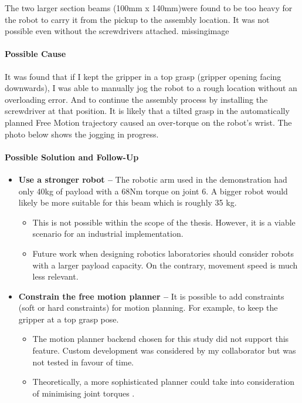 The two larger section beams (100mm x 140mm)were found to be too heavy for the robot to carry it from the pickup to the assembly location. It was not possible even without the screwdrivers attached.
missingimage

\paragraph{Possible Cause}
It was found that if I kept the gripper in a top grasp (gripper opening facing downwards), I was able to manually jog the robot to a rough location without an overloading error. And to continue the assembly process by installing the screwdriver at that position. It is likely that a tilted grasp in the automatically planned Free Motion trajectory caused an over-torque on the robot's wrist. The photo below shows the jogging in progress.

\paragraph{Possible Solution and Follow-Up}
\begin{itemize}
    \item \textbf{Use a stronger robot --} The robotic arm used in the demonstration had only 40kg of payload with a 68Nm torque on joint 6. A bigger robot would likely be more suitable for this beam which is roughly 35 kg.
    \begin{itemize}
        \item This is not possible within the scope of the thesis. However, it is a viable scenario for an industrial implementation.
        \item Future work when designing robotics laboratories should consider robots with a larger payload capacity. On the contrary, movement speed is much less relevant.
    \end{itemize}
    \item \textbf{Constrain the free motion planner --} It is possible to add constraints (soft or hard constraints) for motion planning. For example, to keep the gripper at a top grasp pose.
    \begin{itemize}
        \item The motion planner backend chosen for this study did not support this feature. Custom development was considered by my collaborator but was not tested in favour of time.
        \item Theoretically, a more sophisticated planner could take into consideration of minimising joint torques \parencite{gargOptimizationTechniquesApplied2002}.
    \end{itemize}
\end{itemize}

